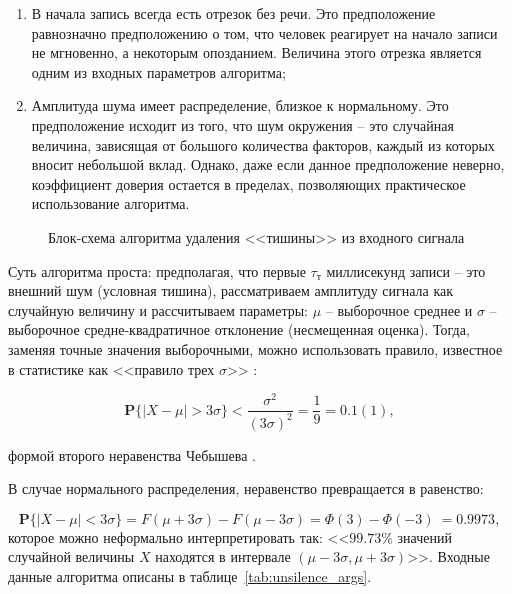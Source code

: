 \begin{enumerate}
\item В начала запись всегда есть отрезок без речи. Это предположение равнозначно предположению о том, что человек реагирует на начало записи не мгновенно, а некоторым опозданием. Величина этого отрезка является одним из входных параметров алгоритма;
\item Амплитуда шума имеет распределение, близкое к нормальному. Это предположение исходит из того, что шум окружения -- это случайная величина, зависящая от большого количества факторов, каждый из которых вносит небольшой вклад. Однако, даже если данное предположение неверно, коэффициент доверия остается в пределах, позволяющих практическое использование алгоритма.
\end{enumerate}

\begin{figure}[htp!]
    \caption{Блок-схема алгоритма удаления <<тишины>> из входного сигнала}
    \label{fig:silence_remove_flowchart}
\end{figure}

Суть алгоритма проста: предполагая, что первые $\tau_т$ миллисекунд записи -- это внешний шум (условная тишина), рассматриваем амплитуду сигнала как случайную величину и рассчитываем параметры: $\mu$ -- выборочное среднее и $\sigma$ -- выборочное средне-квадратичное отклонение (несмещенная оценка). Тогда, заменяя точные значения выборочными, можно использовать правило, известное в статистике как <<правило трех $\sigma$>> \cite{Pukelsheim1994threesigma}:

\begin{equation}
\textbf{P} \{|X - \mu| > 3\sigma\} < \frac{\sigma^2}{(3\sigma)^2} = \frac{1}{9} = 0.1(1),
\end{equation}

 формой второго неравенства Чебышева \cite{BMSTUM17}.

В случае нормального распределения, неравенство превращается в равенство:

\begin{equation}
\textbf{P} \{|X - \mu| < 3\sigma\} = F(\mu + 3\sigma) - F(\mu - 3\sigma) = \Phi(3) - \Phi(-3) ~= 0.9973,
\end{equation}
которое можно неформально интерпретировать так: <<$99.73\%$ значений случайной величины $X$ находятся в интервале $(\mu - 3\sigma, \mu + 3\sigma)$>>.
Входные данные алгоритма описаны в таблице~\ref{tab:unsilence_args}.

